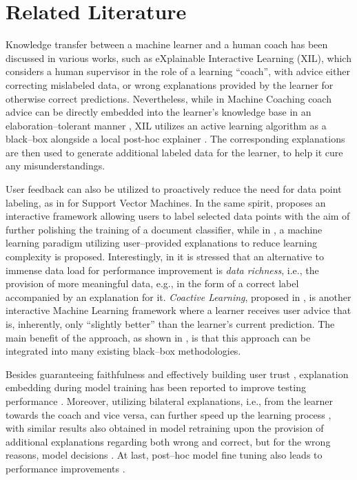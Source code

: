 \documentclass[a4paper,twoside]{article}
\begin{document}
\section{Related Literature}\label{sec:related-literature}
%
Knowledge transfer between a machine learner and a human coach has been discussed in various works, such as eXplainable Interactive Learning (XIL), \cite{tesoKerstingIML2019} which considers a human supervisor in the role of a learning ``coach'', with advice either correcting mislabeled data, or wrong explanations provided by the learner for otherwise correct predictions. Nevertheless, while in Machine Coaching coach advice can be directly embedded into the learner's knowledge base in an elaboration--tolerant manner \cite{mccarthyElaborationTolerance1998}, XIL utilizes an active learning algorithm as a black--box \cite{Settles2009ActiveLL} alongside a local post-hoc explainer \cite{ribeiro2016}. The corresponding explanations are then used to generate additional labeled data for the learner, to help it cure any misunderstandings.

User feedback can also be utilized to proactively reduce the need for data point labeling, as in \cite{raghavanAllan2007} for Support Vector Machines. In the same spirit, \cite{settles-2011-closing} proposes an interactive framework allowing users to label selected data points with the aim of further polishing the training of a document classifier, while in \cite{zaidan2007using}, a machine learning paradigm utilizing user--provided explanations to reduce learning complexity is proposed. Interestingly, in \cite{zaidan2007using} it is stressed that an alternative to immense data load for performance improvement is \emph{data richness}, i.e., the provision of more meaningful data, e.g., in the form of a correct label accompanied by an explanation for it. \emph{Coactive Learning}, proposed in \cite{shivaswamyJoachims2015}, is another interactive Machine Learning framework where a learner receives user advice that is, inherently, only ``slightly better'' than the learner's current prediction. The main benefit of the approach, as shown in \cite{shivaswamyJoachims2015}, is that this approach can be integrated into many existing black--box  methodologies.

Besides guaranteeing faithfulness and effectively building user trust \cite{BARREDOARRIETA202082}, explanation embedding during model training has been reported to improve testing performance \cite{Selvaraju_2019}. Moreover, utilizing bilateral explanations, i.e., from the learner towards the coach and vice versa, can further speed up the learning process \cite{dongSu2017}, with similar results also obtained in model retraining upon the provision of additional explanations regarding both wrong and correct, but for the wrong reasons, model decisions \cite{riegerSingh2019}. At last, post--hoc model fine tuning also leads to performance improvements \cite{ribeiro2016}.
\end{document}
